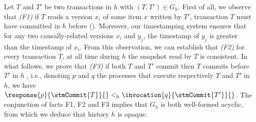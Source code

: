 

Let $T$ and $T'$ be two transactions in $h$ with $(T,T') \in G_h$.
First of all, we observe that \emph{(F1)} if $T$ reads a version $x_i$ of some item $x$ written by $T'$, 
transaction $T$ must have committed in $h$ before ().
Moreover, our timestamping system ensures that for any two causally-related versions $x_i$ and $y_j$,
the timestamp of $y_j$ is greater than the timestamp of $x_i$.
From this observation, we can establish that \emph{(F2)} for every transaction $T$, 
at all time during $h$ the snapshot read by $T$ is consistent.
In what follows, we prove that \emph{(F3)} if both $T$ and $T'$ commit then $T$ commits before $T'$ in $h$ , i.e., 
denoting $p$ and $q$ the processes that execute respectively $T$ and $T'$ in $h$, 
we have $\response{p}{\stmCommit{T}}{} <_h \invocation{q}{\stmCommit{T'}}{}$.
The conjunction of facts F1, F2 and F3 implies that $G_h$ is both well-formed acyclic, 
from which we deduce that history $h$ is opaque.

  






